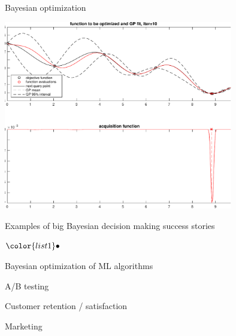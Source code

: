 \documentclass[t]{beamer}
\newenvironment{list1}{
   \begin{list}{$\color{list1}\bullet$}{\itemsep=6pt}}{
  \end{list}}
\begin{document}
\begin{frame}
  
  {\Large\color{navyblue} Bayesian optimization}

    \includegraphics[width=10cm]{bayesopt_1d_regular_iter10-crop.pdf}

\end{frame}

\begin{frame}{Examples of big Bayesian decision making success stories}

  \begin{list1}
    \item Bayesian optimization of ML algorithms
    \item A/B testing
    \item Customer retention / satisfaction
    \item Marketing
  \end{list1}
  
\end{frame}
\end{document}
